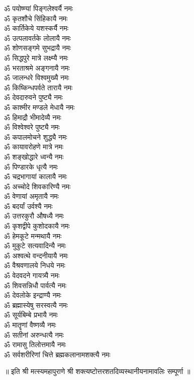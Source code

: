 \begin{multicols}{2}
\begin{flushleft}
ॐ पयोष्ण्यां पिङ्गलेश्वर्यै नमः\\
ॐ कृतशौचे सिंहिकायै नमः\\
ॐ कार्तिकेये यशस्कर्यै नमः\\
ॐ उत्पलावर्तके लोलायै नमः\\
ॐ शोणसङ्गमे सुभद्रायै नमः\\
ॐ सिद्धपुरे मात्रे लक्ष्म्यै नमः\\
ॐ भरताश्रमे अङ्गनायै नमः\\
ॐ जालन्धरे विश्वमुख्यै नमः\hfill{}\\
ॐ किष्किन्धपर्वते तारायै नमः\\
ॐ देवदारुवने पुष्ट्यै नमः\\
ॐ काश्मीर मण्डले मेधायै नमः\\
ॐ हिमाद्रौ भीमादेव्यै नमः\\
ॐ विश्वेश्वरे पुष्ट्यै नमः\\
ॐ कपालमोचने शुद्ध्यै नमः\\
ॐ कायावरोहणे मात्रे नमः\\
ॐ शङ्खोद्धारे ध्वन्यै नमः\\
ॐ पिण्डारके धृत्यै नमः\\
ॐ चद्रभागायां कालायै नमः\hfill{}\\
ॐ अच्चोदे शिवकारिण्यै नमः\\
ॐ वेणायां अमृतायै नमः\\
ॐ बदर्यां उर्वश्यै नमः\\
ॐ उत्तरकुरौ औषध्यै नमः\\
ॐ कृशद्वीपे कुशोदकायै नमः\\
ॐ हेमकूटे मन्मथायै नमः\\
ॐ मुकुटे सत्यवादिन्यै नमः\\
ॐ अश्वत्थे वन्दनीयायै नमः\\
ॐ वैश्रवणालये निधये नमः\\
ॐ वेदवदने गायत्र्यै नमः\hfill{}\\
ॐ शिवसन्निधौ पार्वत्यै नमः\\
ॐ देवलोके इन्द्राण्यै नमः\\
ॐ ब्रह्मास्येषु सरस्वत्यै नमः\\
ॐ सूर्यबिम्बे प्रभायै नमः\\
ॐ मातॄणां वैष्णव्यै नमः\\
ॐ सतीनां अरुन्धत्यै नमः\\
ॐ रामासु तिलोत्तमायै नमः\\
ॐ सर्वशरीरिणां चित्ते ब्रह्मकलानामशक्त्यै नमः\\
\end{flushleft}
\end{multicols}
\centerline{॥ इति श्री मत्स्यमहापुराणे श्री शक्त्यष्टोत्तरशतदिव्यस्थानीयनामावलिः सम्पूर्णा ॥}
